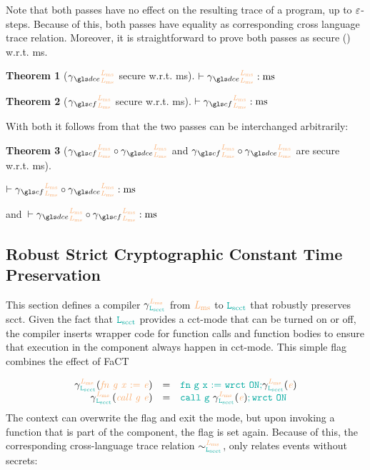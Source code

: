 \documentclass[acmsmall]{acmart}
\theoremstyle{definition}
\newtheorem{theorem}{Theorem}[section]
\begin{document}
Note that both passes have no effect on the resulting trace of a program, up to $\varepsilon$-steps. 
Because of this, both passes have equality as corresponding cross language trace relation. 
Moreover, it is straightforward to prove both passes as secure () w.r.t. \gls*{ms}. 

\begin{theorem}[$\ccdce$ secure w.r.t. \gls*{ms}]\label{thm:ccdce:rtp:ms}
  $\rtp{\ccdce}{\mssafe}$ %
\end{theorem}
\begin{theorem}[$\cccf$ secure w.r.t. \gls*{ms}]\label{thm:cccf:rtp:ms}
  $\rtp{\cccf}{\mssafe}$ %
\end{theorem}

With both  it follows from  that the two passes can be interchanged arbitrarily:

\begin{theorem}[$\cccf\circ\ccdce$ and $\cccf\circ\ccdce$ are secure w.r.t. \gls*{ms}]\label{thm:cccfccdce:rtp:ms}
$\;$ 

  \begin{nscenter}
  \phantom{and~}\!\!$\rtp{\cccf\circ\ccdce}{\mssafe}$ 

  and~$\rtp{\ccdce\circ\cccf}{\mssafe}$ %
  \end{nscenter}
\end{theorem}

\subsection{Robust Strict Cryptographic Constant Time Preservation}\label{subsec:cs:scct}

This section defines a compiler $\ccscct$ from $\Lms$ to $\Lscct$ that robustly preserves \gls*{scct}. 
Given the fact that $\Lscct$ provides a \gls*{cct}-mode that can be turned on or off, the compiler inserts wrapper code for function calls and function bodies to ensure that execution in the component always happen in \gls*{cct}-mode.
This simple flag combines the effect of FaCT~\cite{cauligi2019fact} 

\vspace{-1em}
\[
\begin{array}{rcl}
  \ccscct(\irl{\lfunction{g}{x}{\expr}}) & = & \lfunction[\obj]{\obj{g}}{\obj{x}}{\obj{\lwrdoit{ON};}\ccscct(\irl{\expr})} \\
  \ccscct(\irl{\lcall{g}{\expr}}) & = & \lcall[\obj]{\obj{g}}{\ccscct(\irl{\expr})\obj{; \lwrdoit{ON}}} 
\end{array}
\]
%
The context can overwrite the flag and exit the mode, but upon invoking a function that is part of the component, the flag is set again.
Because of this, the corresponding cross-language trace relation $\sim^{\Lms}_{\Lscct}$, only relates events without secrets:%
\end{document}
